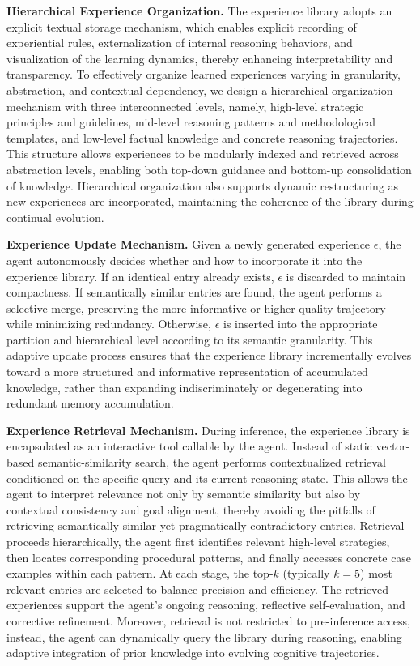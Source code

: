 \documentclass{article}
\begin{document}
\textbf{Hierarchical Experience Organization.}
The experience library adopts an explicit textual storage mechanism, which enables explicit recording of experiential rules, externalization of internal reasoning behaviors, and visualization of the learning dynamics, thereby enhancing interpretability and transparency.
To effectively organize learned experiences varying in granularity, abstraction, and contextual dependency, we design a hierarchical organization mechanism with three interconnected levels, namely, high-level strategic principles and guidelines, mid-level reasoning patterns and methodological templates, and low-level factual knowledge and concrete reasoning trajectories.
This structure allows experiences to be modularly indexed and retrieved across abstraction levels, enabling both top-down guidance and bottom-up consolidation of knowledge.
Hierarchical organization also supports dynamic restructuring as new experiences are incorporated, maintaining the coherence of the library during continual evolution.

\textbf{Experience Update Mechanism.}
Given a newly generated experience $\epsilon$, the agent autonomously decides whether and how to incorporate it into the experience library. 
If an identical entry already exists, $\epsilon$ is discarded to maintain compactness. 
If semantically similar entries are found, the agent performs a selective merge, preserving the more informative or higher-quality trajectory while minimizing redundancy. 
Otherwise, $\epsilon$ is inserted into the appropriate partition and hierarchical level according to its semantic granularity. 
This adaptive update process ensures that the experience library incrementally evolves toward a more structured and informative representation of accumulated knowledge, rather than expanding indiscriminately or degenerating into redundant memory accumulation.

\textbf{Experience Retrieval Mechanism.}
During inference, the experience library is encapsulated as an interactive tool callable by the agent.
Instead of static vector-based semantic-similarity search, the agent performs contextualized retrieval conditioned on the specific query and its current reasoning state. 
This allows the agent to interpret relevance not only by semantic similarity but also by contextual consistency and goal alignment, thereby avoiding the pitfalls of retrieving semantically similar yet pragmatically contradictory entries.
Retrieval proceeds hierarchically, the agent first identifies relevant high-level strategies, then locates corresponding procedural patterns, and finally accesses concrete case examples within each pattern. 
At each stage, the top-$k$ (typically $k=5$) most relevant entries are selected to balance precision and efficiency. 
The retrieved experiences support the agent’s ongoing reasoning, reflective self-evaluation, and corrective refinement.
Moreover, retrieval is not restricted to pre-inference access, instead, the agent can dynamically query the library during reasoning, enabling adaptive integration of prior knowledge into evolving cognitive trajectories.
\end{document}
